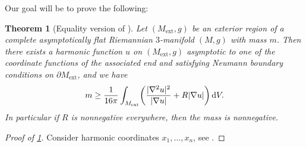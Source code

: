 \documentclass[draft]{amsart}
\newtheorem{theorem}{Theorem}
\newcommand*{\mathfullstop}{.}
\DeclarePairedDelimiter{\parens}{(}{)}
\let\p\parens %
\newcommand*{\boundary}{\partial}
\DeclarePairedDelimiter{\abs}{\lvert}{\rvert} %
\newcommand{\ext}{\mathrm{ext}} %
\newcommand*{\nolink}[1]{%
  {\protect\NoHyper#1\protect\endNoHyper}%
}
\begin{document}
Our goal will be to prove the following:
\begin{theorem}[Equality version of \texorpdfstring{}{\nolink}{\cite[Theorem 1.2]{brayHarmonicFunctionsMass2019}}]\label{thm:harmonic_mass_equality}
    Let \( (M_\ext,g) \) be an exterior region of a complete asymptotically flat Riemannian \( 3 \)-manifold \( (M,g) \) with mass \( m \). Then there exists a harmonic function \( u \) on \( (M_\ext,g) \) asymptotic to one of the coordinate functions of the associated end and satisfying Neumann boundary conditions on \( \boundary{M_\ext} \), and we have
    \begin{equation*}
        m\geq \frac{1}{16\pi}\int_{M_{\ext}}\p*{\frac{\abs{\nabla^2 u}^2}{\abs{\nabla u}}+R\abs{\nabla u}}\odif{V}\mathfullstop
    \end{equation*}
    In particular if \( R \) is nonnegative everywhere, then the mass is nonnegative.
\end{theorem}
\begin{proof}[Proof of \cref{thm:harmonic_mass_equality}]
    Consider harmonic coordinates \( x_1,\dotsc,x_n \), see \cite[Section 3.2]{brayHarmonicFunctionsMass2019}. 
\end{proof}
\end{document}
